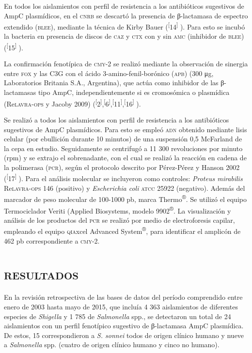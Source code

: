 \documentclass{article}
\begin{document}
En todos los aislamientos con perfil de resistencia a los antibióticos
sugestivos de AmpC plasmídicos, en el \textsc{cnrb} se descartó la presencia de
β-lactamasa de espectro extendido (\textsc{blee}), mediante la técnica de Kirby Bauer
(\textsuperscript{[}14\textsuperscript{]}
). Para esto se incubó la bacteria en presencia de discos de \textsc{caz} y \textsc{ctx} con y sin
\textsc{amc} (inhibidor de \textsc{blee}) (\textsuperscript{[}15\textsuperscript{]}
).

La confirmación fenotípica de \textsc{cmy}-2 se realizó mediante la observación de
sinergia entre \textsc{fox} y las C3G con el ácido 3-amino-fenil-borónico (\textsc{apb}) (300 μg,
Laboratorios Britania S.A., Argentina), que actúa como inhibidor de las
β-lactamasas tipo AmpC, independientemente si es cromosómica o plasmídica
(Re\textsc{lavra}-\textsc{ops} y Jacoby 2009) (\textsuperscript{[}2\textsuperscript{]},\textsuperscript{[}6\textsuperscript{]},\textsuperscript{[}11\textsuperscript{]},\textsuperscript{[}16\textsuperscript{]}
).

Se realizó a todos los aislamientos con perfil de resistencia a los antibióticos
sugestivos de AmpC plasmídicos. Para esto se empleó \textsc{adn} obtenido mediante lisis
celular (por ebullición durante 10 minutos) de una suspensión 0,5 McFarland de
la cepa en estudio. Seguidamente se centrifugó a 11 300 revoluciones por minuto
(rpm) y se extrajo el sobrenadante, con el cual se realizó la reacción en cadena
de la polimerasa (\textsc{pcr}), según el protocolo descrito por Pérez-Pérez y Hanson
2002 (\textsuperscript{[}17\textsuperscript{]}
). Para el análisis molecular se incluyeron como controles: \textit{Proteus
mirabilis}
Re\textsc{lavra}-\textsc{ops} 146 (positivo) y \textit{Escherichia coli}
\textsc{atcc} 25922 (negativo). Además del marcador de peso molecular de 100-1000 pb,
marca Thermo\textsuperscript{®}. Se utilizó el equipo Termociclador Veriti (Applied Biosystems, modelo
9902\textsuperscript{®}. La visualización y análisis de los productos del \textsc{pcr} se realizó por medio de
electroforesis capilar, empleando el equipo \textsc{qia}xcel Advanced
System\textsuperscript{®}, para identificar el amplicón de 462 pb correspondiente a \textsc{cmy}-2.

\section{\textsc{resultados}}

En la revisión retrospectiva de las bases de datos del período comprendido entre
enero de 2003 hasta mayo de 2015, que incluía 4 363 aislamientos de diferentes
especies de \textit{Shigella}
y 1 785 de \textit{Salmonella}
spp., se detectaron un total de 24 aislamientos con un perfil fenotípico
sugestivo de β-lactamasa AmpC plasmídica. De estos, 15 correspondieron a
\textit{S. sonnei}
todos de origen clínico humano y nueve a \textit{Salmonella}
spp. (cuatro de origen clínico humano y cinco no humano).
\end{document}

